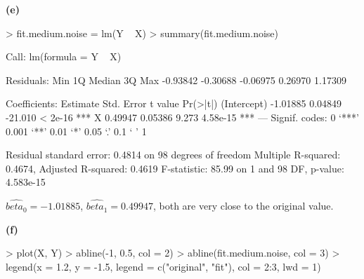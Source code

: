 \documentclass[a4paper]{article}
\renewcommand{\part}[1] {\vspace{.10in} {\bf (#1)}}
\begin{document}
\part{e}
\begin{Schunk}
\begin{Sinput}
> fit.medium.noise = lm(Y ~ X)
> summary(fit.medium.noise)
\end{Sinput}
\begin{Soutput}
Call:
lm(formula = Y ~ X)

Residuals:
     Min       1Q   Median       3Q      Max 
-0.93842 -0.30688 -0.06975  0.26970  1.17309 

Coefficients:
            Estimate Std. Error t value Pr(>|t|)    
(Intercept) -1.01885    0.04849 -21.010  < 2e-16 ***
X            0.49947    0.05386   9.273 4.58e-15 ***
---
Signif. codes:  0 ‘***’ 0.001 ‘**’ 0.01 ‘*’ 0.05 ‘.’ 0.1 ‘ ’ 1

Residual standard error: 0.4814 on 98 degrees of freedom
Multiple R-squared:  0.4674,	Adjusted R-squared:  0.4619 
F-statistic: 85.99 on 1 and 98 DF,  p-value: 4.583e-15
\end{Soutput}
\end{Schunk}
\begin{enumerate}
{\color{red}
\item $\hat{beta_0} = -1.01885$, $\hat{beta_1} = 0.49947$, both are very close to the original value.
}
\end{enumerate}

\part{f}
\begin{Schunk}
\begin{Sinput}
> plot(X, Y)
> abline(-1, 0.5, col = 2)
> abline(fit.medium.noise, col = 3)
> legend(x = 1.2, y = -1.5, legend = c("original", "fit"), col = 2:3, lwd = 1)
\end{Sinput}
\end{Schunk}
\end{document}
